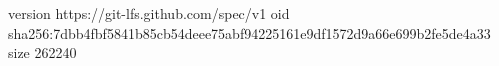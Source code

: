 version https://git-lfs.github.com/spec/v1
oid sha256:7dbb4fbf5841b85cb54deee75abf94225161e9df1572d9a66e699b2fe5de4a33
size 262240
